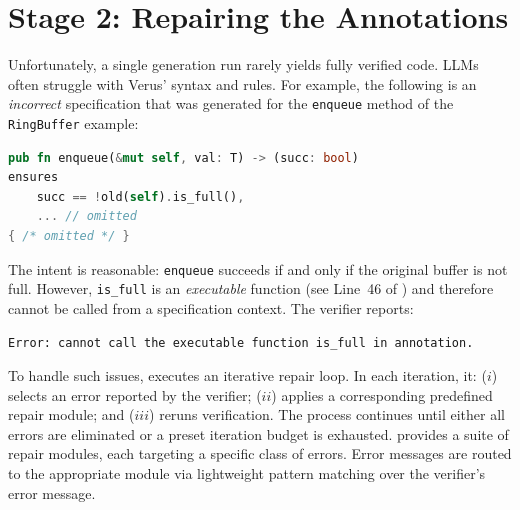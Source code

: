 
\section{Stage 2: Repairing the Annotations}
\label{sec:fixfunc}

Unfortunately, a single generation run rarely yields fully verified code. LLMs often struggle with Verus' syntax and rules. For example, the following is an \emph{incorrect} specification that was generated for the \texttt{enqueue} method of the \texttt{RingBuffer} example:
\begin{lstlisting}[language=Rust,style=boxed,showstringspaces=false,basicstyle=\small\ttfamily]
pub fn enqueue(&mut self, val: T) -> (succ: bool)
ensures
    succ == !old(self).is_full(),
    ... // omitted
{ /* omitted */ }
\end{lstlisting}
The intent is reasonable: \texttt{enqueue} succeeds if and only if the original buffer is not full. However, \texttt{is\_full} is an \emph{executable} function (see Line~46 of ) and therefore cannot be called from a specification context.
The verifier reports:
\begin{lstlisting}[basicstyle=\fontsize{8pt}{7pt}\normalfont\ttfamily,frame=single,breaklines=true,escapechar=@,breakindent=0pt]
Error: cannot call the executable function is_full in annotation.
\end{lstlisting}

To handle such issues, \toolname{} executes an {iterative repair loop}. In each iteration, it: ($i$) selects an error reported by the verifier; ($ii$) applies a corresponding predefined repair module; and ($iii$) reruns verification. The process continues until either all errors are eliminated or a preset iteration budget is exhausted. \toolname{} provides a suite of repair modules, each targeting a specific class of errors. Error messages are routed to the appropriate module via lightweight pattern matching over the verifier's error message.

